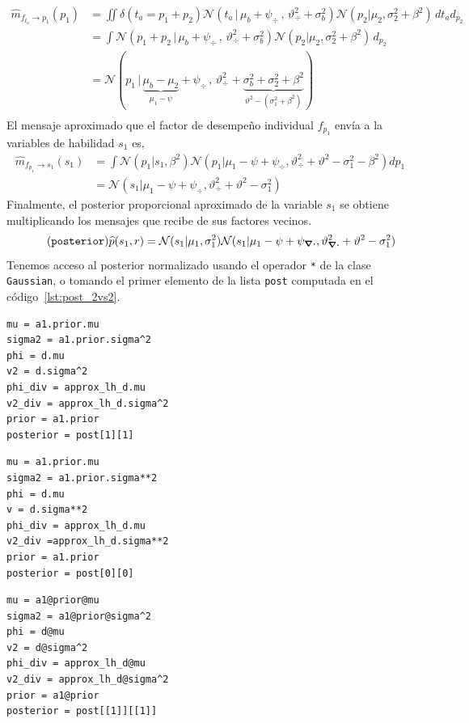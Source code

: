 \documentclass[a4paper,11pt]{book}
\newcommand{\N}{\mathcal{N}}
\theoremstyle{definition}
\begin{document}
%
\begin{equation}
\begin{split}
\widehat{m}_{f_{t_a} \rightarrow p_1}(p_1) &= \iint \delta(t_a = p_1 + p_2) \N(t_a \, | \, \mu_b + \psi_{\div} \, , \, \vartheta_{\div}^2 + \sigma_b^2) \N(p_2 | \mu_2 , \sigma_2^2 + \beta^2)  \, d{t_a} d_{p_2} \\
& = \int \N(p_1 + p_2 \, | \, \mu_b + \psi_{\div} \, , \, \vartheta_{\div}^2 + \sigma_b^2) \N(p_2 | \mu_2 , \sigma_2^2+ \beta^2 )   \, d_{p_2} \\
& = \N( p_1 \,|\,  \underbrace{\mu_b - \mu_2}_{\mu_1-\psi} + \psi_{\div}  \,,\,\vartheta_{\div}^2 + \underbrace{\sigma_b^2 + \sigma_2^2 + \beta^2}_{\vartheta^2 - (\sigma_1^2 + \beta^2)})  \\
\end{split}
\end{equation}
%
El mensaje aproximado que el factor de desempe\~no individual $f_{p_1}$ env\'ia a la variables de habilidad $s_1$ es,
%
\begin{equation}
\begin{split}
\widehat{m}_{f_{p_1} \rightarrow s_1}(s_1) & = \int \N(p_1|s_1,\beta^2) \N(p_1| \mu_1 - \psi + \psi_{\div}, \vartheta_{\div}^2 + \vartheta^2 - \sigma_1^2 - \beta^2)dp_1 \\
& = \N(s_1| \mu_1 - \psi + \psi_{\div}, \vartheta_{\div}^2 + \vartheta^2 - \sigma_1^2)
\end{split}
\end{equation}
%
Finalmente, el posterior proporcional aproximado de la variable $s_1$ se obtiene multiplicando los mensajes que recibe de sus factores vecinos.
%
\begin{equation}\label{eq:^p_s} \tag{\texttt{posterior}}
 \widehat{p}(s_1, r) = \N(s_1|\mu_1, \sigma_1^2) \N(s_1| \mu_1 - \psi + \psi_{\div}, \vartheta_{\div}^2 + \vartheta^2 - \sigma_1^2)
\end{equation}
%
Tenemos acceso al posterior normalizado usando el operador \texttt{*} de la clase \texttt{Gaussian}, o tomando el primer elemento de la lista \texttt{post} computada en el c\'odigo~\ref{lst:post_2vs2}.
%
\begin{paracol}{3}
\begin{lstlisting}[backgroundcolor=\color{julia!60},belowskip=-0.77 \baselineskip]
mu = a1.prior.mu
sigma2 = a1.prior.sigma^2
phi = d.mu
v2 = d.sigma^2
phi_div = approx_lh_d.mu
v2_div = approx_lh_d.sigma^2
prior = a1.prior
posterior = post[1][1]
\end{lstlisting}
\switchcolumn
\begin{lstlisting}[backgroundcolor=\color{python!60},belowskip=-0.77 \baselineskip]
mu = a1.prior.mu
sigma2 = a1.prior.sigma**2
phi = d.mu
v = d.sigma**2
phi_div = approx_lh_d.mu
v2_div =approx_lh_d.sigma**2
prior = a1.prior
posterior = post[0][0]
\end{lstlisting}
\switchcolumn
\begin{lstlisting}[backgroundcolor=\color{r!50},belowskip=-0.77 \baselineskip]
mu = a1@prior@mu
sigma2 = a1@prior@sigma^2
phi = d@mu
v2 = d@sigma^2
phi_div = approx_lh_d@mu
v2_div = approx_lh_d@sigma^2
prior = a1@prior
posterior = post[[1]][[1]]
\end{lstlisting}
\end{paracol}
\end{document}
